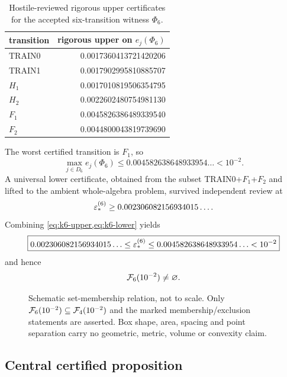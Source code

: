 \begin{table}[ht]
\centering
\caption{Hostile-reviewed rigorous upper certificates for the accepted six-transition witness $\Phi_6$.}
\label{tab:k6-uppers}
\begin{tabular}{lr}
\toprule
transition & rigorous upper on $e_j(\Phi_6)$\\
\midrule
TRAIN0 & 0.0017360413721420206\\
TRAIN1 & 0.0017902995810885707\\
$H_1$ & 0.0017010819506354795\\
$H_2$ & 0.0022602480754981130\\
$F_1$ & 0.0045826386489339540\\
$F_2$ & 0.0044800043819739690\\
\bottomrule
\end{tabular}
\end{table}

The worst certified transition is $F_1$, so
\begin{equation}
\max_{j\in D_6}e_j(\Phi_6)
\le0.004582638648933954\ldots<10^{-2}.
\label{eq:k6-upper}
\end{equation}
A universal lower certificate, obtained from the subset TRAIN0+$F_1$+$F_2$ and lifted to the ambient whole-algebra problem, survived independent review at
\begin{equation}
\varepsilon_*^{(6)}\ge0.002306082156934015\ldots .
\label{eq:k6-lower}
\end{equation}
Combining \cref{eq:k6-upper,eq:k6-lower} yields
\begin{equation}
\boxed{
0.002306082156934015\ldots
\le\varepsilon_*^{(6)}
\le0.004582638648933954\ldots
<10^{-2}}
\label{eq:k6-bracket}
\end{equation}
and hence
\begin{equation}
\mathcal F_6(10^{-2})\neq\varnothing.
\label{eq:f6-nonempty}
\end{equation}

\begin{figure}[ht]
\centering

\caption{Schematic set-membership relation, not to scale.  Only $\mathcal F_6(10^{-2})\subseteq\mathcal F_4(10^{-2})$ and the marked membership/exclusion statements are asserted.  Box shape, area, spacing and point separation carry no geometric, metric, volume or convexity claim.}
\label{fig:nested-sets}
\end{figure}

\subsection{Central certified proposition}

